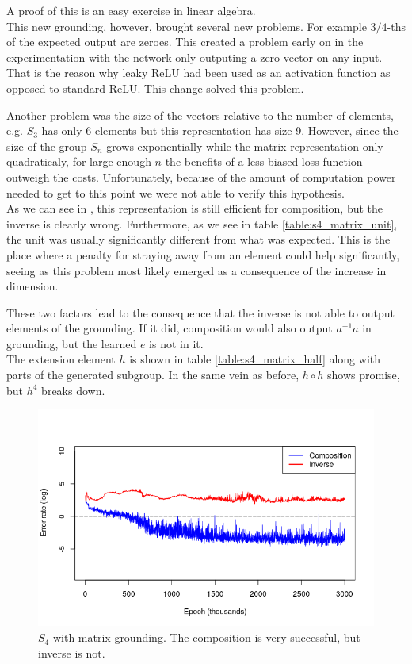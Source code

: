 A proof of this is an easy exercise in linear algebra. \\

This new grounding, however, brought several new problems. For example $3/4$-ths of the expected output are zeroes. This created a problem early on in the experimentation with the network only outputing a zero vector on any input. That is the reason why leaky ReLU had been used as an activation function as opposed to standard ReLU. This change solved this problem.

Another problem was the size of the vectors relative to the number of elements, e.g. $S_3$ has only 6 elements but this representation has size 9. However, since the size of the group $S_n$ grows exponentially while the matrix representation only quadraticaly, for large enough $n$ the benefits of a less biased loss function outweigh the costs. Unfortunately, because of the amount of computation power needed to get to this point we were not able to verify this hypothesis.\\

As we can see in , this representation is still  efficient for composition, but the inverse is clearly wrong. Furthermore, as we see in table \ref{table:s4_matrix_unit}, the unit was usually significantly different from what was expected. This is the place where a penalty for straying away from an element could help significantly, seeing as this problem most likely emerged as a consequence of the increase in dimension.

These two factors lead to the consequence that the inverse is not able to output elements of the grounding. If it did, composition would also output $a^{-1}a$ in grounding, but the learned $e$ is not in it.\\

The extension element $h$ is shown in table \ref{table:s4_matrix_half} along with parts of the generated subgroup. In the same vein as before, $h\circ h$ shows promise, but $h^4$ breaks down.

\begin{figure}
\center
\caption{$S_4$ with matrix grounding. The composition is very successful, but inverse is not.}
\label{graph:s4_matrix}
\includegraphics[width=\linewidth]{../img/s4_matrix.png}
\end{figure}

